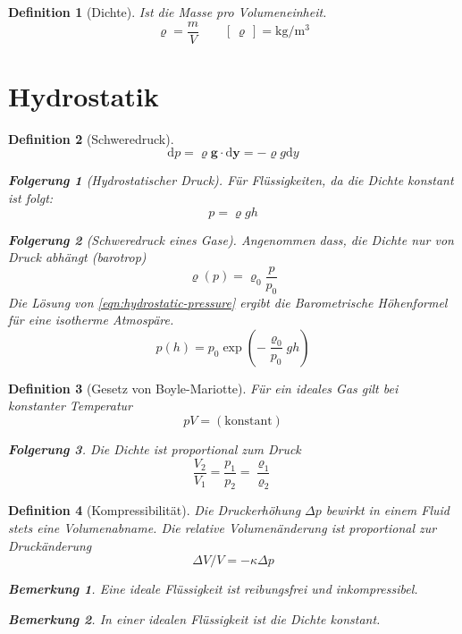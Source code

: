 \documentclass[a4paper, twocolumn]{article}
\numberwithin{equation}{section}
\theoremstyle{hsr-def}
\newtheorem{definition}{Definition}[section]
\theoremstyle{hsr-sub}
\newtheorem{result}{Folgerung}[definition]
\newtheorem{remark}{Bemerkung}[definition]
\newcommand{\dd}[1]{\ensuremath{\mathrm{d}#1}}
\renewcommand{\vec}[1]{\ensuremath{\mathbf{#1}}}
\newcommand{\unitsof}[1]{\ensuremath{\left[\,#1\,\right]}}
\begin{document}
\begin{definition}[Dichte] Ist die Masse pro Volumeneinheit.
\[
    \varrho = \frac{m}{V} \qquad \unitsof{\varrho} = \si{\kilo\gram\per\cubic\metre}
\]
\end{definition}

\section{Hydrostatik}

\begin{definition}[Schweredruck]
\begin{equation} \label{eqn:hydrostatic-pressure}
    \dd{p} = \varrho \vec{g} \cdot \dd{\vec{y}} = - \varrho g \dd{y}
\end{equation}

\begin{result}[Hydrostatischer Druck]
F\"ur Fl\"ussigkeiten, da die Dichte konstant ist folgt:
\[
    p = \varrho g h
\]
\end{result}

\begin{result}[Schweredruck eines Gase]
Angenommen dass, die Dichte nur von Druck abh\"angt (barotrop)
\[
    \varrho(p) = \varrho_0 \frac{p}{p_0}
\]
Die L\"osung von \eqref{eqn:hydrostatic-pressure} ergibt die \emph{Barometrische H\"ohenformel} f\"ur eine isotherme Atmosp\"are.
\[
    p(h) = p_0 \exp\left(-\frac{\varrho_0}{p_0} gh\right)
\]
\end{result}
\end{definition}

\begin{definition}[Gesetz von Boyle-Mariotte]
F\"ur ein ideales Gas gilt bei konstanter Temperatur
\[
    pV = (\text{konstant})
\]

\begin{result}
Die Dichte ist proportional zum Druck
\[
    \frac{V_2}{V_1} = \frac{p_1}{p_2} = \frac{\varrho_1}{\varrho_2}
\]
\end{result}
\end{definition}


\begin{definition}[Kompressibilit\"at]
Die Druckerh\"ohung \(\Delta p\) bewirkt in einem Fluid stets eine Volumenabname.
Die relative Volumen\"anderung ist proportional zur Druck\"anderung
\[
    \Delta V / V = - \kappa \Delta p
\]

\begin{remark}
    Eine ideale Fl\"ussigkeit ist reibungsfrei und inkompressibel.
\end{remark}

\begin{remark}
    In einer idealen Fl\"ussigkeit ist die Dichte konstant.
\end{remark}
\end{definition}
\end{document}
